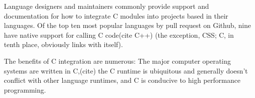 Language designers and maintainers commonly provide support and documentation for how to integrate C modules into projects based in their languages.  Of the top ten most popular languages by pull request on Github\cite{Octoverse}, nine have native support for calling C code\cite{JavascriptCiface}\cite{PythonCiface}\cite{JavaCiface}\cite{RubyCiface}\cite{PHPCiface}\cite{DotNetCiface}\cite{GoCiface}(cite C++) (the exception, CSS; C, in tenth place, obviously links with itself).

The benefits of C integration are numerous: The major computer operating systems are written in C,(cite) the C runtime is ubiquitous and generally doesn't conflict with other language runtimes, and C is conducive to high performance programming.

